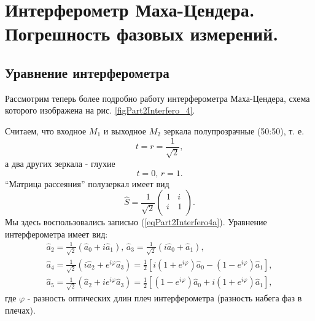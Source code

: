 \section{Интерферометр Маха-Цендера. Погрешность фазовых измерений.}
\subsection{Уравнение интерферометра}
Рассмотрим теперь более подробно работу интерферометра Маха-Цендера,
схема которого изображена на рис. \ref{figPart2Interfero_4}.



Считаем, что входное $M_1$ и выходное $M_2$ зеркала полупрозрачные
(50:50), т. е. 
\[
t = r = \frac{1}{\sqrt{2}},
\]
а два других зеркала - глухие
\[
t = 0, \, r = 1.
\]
``Матрица рассеяния'' полузеркал имеет вид 
\begin{equation}
\hat{S} = \frac{1}{\sqrt{2}} 
\left(
\begin{array}{cc}
1 & i \\
i & 1 \\
\end{array}
\right).
\nonumber
\end{equation}
Мы здесь воспользовались записью (\ref{eqPart2Interfero4a}). Уравнение
интерферометра имеет вид:
\begin{eqnarray}
\hat{a}_2 = \frac{1}{\sqrt{2}} \left(\hat{a}_0 + i \hat{a}_1\right),
\,
\hat{a}_3 = \frac{1}{\sqrt{2}} \left(i \hat{a}_0 + \hat{a}_1\right),
\nonumber \\
\hat{a}_4 = \frac{1}{\sqrt{2}} \left(i \hat{a}_2 + e^{i \varphi}
\hat{a}_3\right) = 
\frac{1}{2}\left[
i \left(1 + e^{i \varphi}\right)\hat{a}_0 -
\left(1 - e^{i \varphi}\right)\hat{a}_1
\right],
\nonumber \\
\hat{a}_5 = \frac{1}{\sqrt{2}} \left(\hat{a}_2 + i e^{i \varphi}
\hat{a}_3\right) = 
\frac{1}{2}\left[
\left(1 - e^{i \varphi}\right)\hat{a}_0 +
i \left(1 + e^{i \varphi}\right)\hat{a}_1
\right],
\label{eqPart2Interfero11}
\end{eqnarray}
где $\varphi$ - разность оптических длин плеч интерферометра (разность
набега фаз в плечах).

